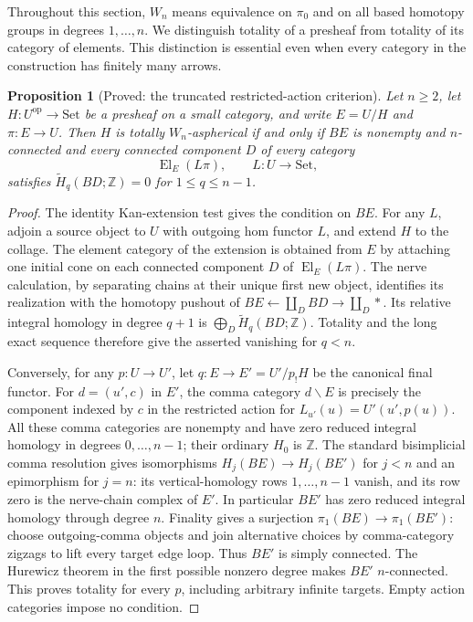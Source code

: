 \documentclass[11pt,a4paper]{article}
\newtheorem{proposition}[theorem]{Proposition}
\theoremstyle{definition}
\theoremstyle{remark}
\begin{document}
Throughout this section, $W_n$ means equivalence on $\pi_0$ and on all based homotopy groups in degrees $1,\ldots,n$. We distinguish totality of a presheaf from totality of its category of elements. This distinction is essential even when every category in the construction has finitely many arrows.

\begin{proposition}[Proved: the truncated restricted-action criterion]\label{C:truncated-presheaf}
Let $n\geq2$, let $H:U^{\mathrm{op}}\to\mathrm{Set}$ be a presheaf on a small category, and write $E=U/H$ and $\pi:E\to U$. Then $H$ is totally $W_n$-aspherical if and only if $BE$ is nonempty and $n$-connected and every connected component $D$ of every category
\[
 \operatorname{El}_E(L\pi),\qquad L:U\longrightarrow\mathrm{Set},
\]
satisfies $\widetilde H_q(BD;\mathbb Z)=0$ for $1\leq q\leq n-1$.
\end{proposition}
\begin{proof}
The identity Kan-extension test gives the condition on $BE$. For any $L$, adjoin a source object to $U$ with outgoing hom functor $L$, and extend $H$ to the collage. The element category of the extension is obtained from $E$ by attaching one initial cone on each connected component $D$ of $\operatorname{El}_E(L\pi)$. The nerve calculation, by separating chains at their unique first new object, identifies its realization with the homotopy pushout of $BE\leftarrow\coprod_D BD\to\coprod_D *$. Its relative integral homology in degree $q+1$ is $\bigoplus_D\widetilde H_q(BD;\mathbb Z)$. Totality and the long exact sequence therefore give the asserted vanishing for $q<n$.

Conversely, for any $p:U\to U'$, let $q:E\to E'=U'/p_!H$ be the canonical final functor. For $d=(u',c)$ in $E'$, the comma category $d\backslash E$ is precisely the component indexed by $c$ in the restricted action for $L_{u'}(u)=U'(u',p(u))$. All these comma categories are nonempty and have zero reduced integral homology in degrees $0,\ldots,n-1$; their ordinary $H_0$ is $\mathbb Z$. The standard bisimplicial comma resolution gives isomorphisms $H_j(BE)\to H_j(BE')$ for $j<n$ and an epimorphism for $j=n$: its vertical-homology rows $1,\ldots,n-1$ vanish, and its row zero is the nerve-chain complex of $E'$. In particular $BE'$ has zero reduced integral homology through degree $n$. Finality gives a surjection $\pi_1(BE)\to\pi_1(BE')$: choose outgoing-comma objects and join alternative choices by comma-category zigzags to lift every target edge loop. Thus $BE'$ is simply connected. The Hurewicz theorem in the first possible nonzero degree makes $BE'$ $n$-connected. This proves totality for every $p$, including arbitrary infinite targets. Empty action categories impose no condition.
\end{proof}
\end{document}
